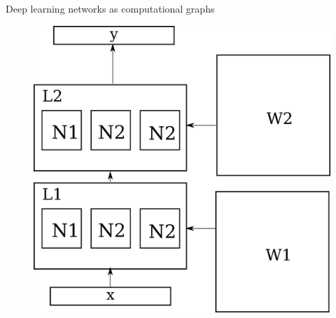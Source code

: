 \documentclass[10pt]{beamer}
\begin{document}
\begin{frame}{Deep learning networks as computational graphs}
{\begin{figure}
		\includegraphics[scale=0.4]{flowgraph3}
	\end{figure}}
\end{frame}
\end{document}
